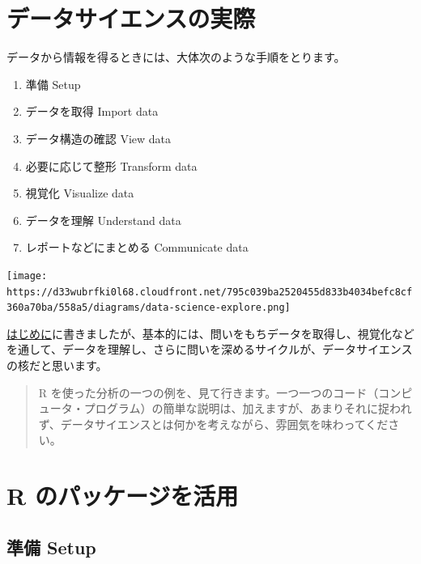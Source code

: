 \documentclass[
  xelatex, ja=standard]{bxjsbook}
\providecommand{\tightlist}{%
  \setlength{\itemsep}{0pt}\setlength{\parskip}{0pt}}
\theoremstyle{definition}
\theoremstyle{definition}
\theoremstyle{definition}
\theoremstyle{definition}
\theoremstyle{remark}
\begin{document}
\hypertarget{ux30c7ux30fcux30bfux30b5ux30a4ux30a8ux30f3ux30b9ux306eux5b9fux969b}{%
\section{データサイエンスの実際}\label{ux30c7ux30fcux30bfux30b5ux30a4ux30a8ux30f3ux30b9ux306eux5b9fux969b}}

データから情報を得るときには、大体次のような手順をとります。

\begin{enumerate}
\def\labelenumi{\arabic{enumi}.}
\tightlist
\item
  準備 Setup
\item
  データを取得 Import data
\item
  データ構造の確認 View data
\item
  必要に応じて整形 Transform data
\item
  視覚化 Visualize data
\item
  データを理解 Understand data
\item
  レポートなどにまとめる Communicate data
\end{enumerate}

\texttt{[image: https://d33wubrfki0l68.cloudfront.net/795c039ba2520455d833b4034befc8cf360a70ba/558a5/diagrams/data-science-explore.png]}

\href{https://icu-hsuzuki.github.io/ds4aj/introduction.html\#introduction}{はじめに}に書きましたが、基本的には、問いをもちデータを取得し、視覚化などを通して、データを理解し、さらに問いを深めるサイクルが、データサイエンスの核だと思います。

\begin{quote}
R を使った分析の一つの例を、見て行きます。一つ一つのコード（コンピュータ・プログラム）の簡単な説明は、加えますが、あまりそれに捉われず、データサイエンスとは何かを考えながら、雰囲気を味わってください。
\end{quote}

\hypertarget{r-ux306eux30d1ux30c3ux30b1ux30fcux30b8ux3092ux6d3bux7528}{%
\section{R のパッケージを活用}\label{r-ux306eux30d1ux30c3ux30b1ux30fcux30b8ux3092ux6d3bux7528}}

\hypertarget{ux6e96ux5099-setup}{%
\subsection{準備 Setup}\label{ux6e96ux5099-setup}}
\end{document}
